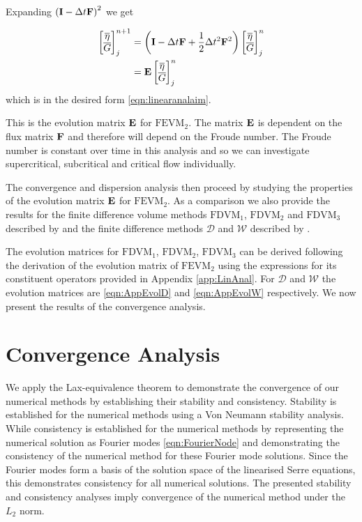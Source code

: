 Expanding $\left(\mathbf{I} - \Delta t\mathbf{F} \right)^2$ we get

\begin{align}
\begin{bmatrix}
\overline{\eta} \\ \overline{G}
\end{bmatrix}^{n+1}_j &= \left(\mathbf{I}  -\Delta t\mathbf{F} + \frac{1}{2}\Delta t^2\mathbf{F}^2 \right) \begin{bmatrix}
\overline{\eta} \\ \overline{G}
\end{bmatrix}^{n}_j \nonumber\\ &=  \mathbf{E}\begin{bmatrix}
\overline{\eta} \\ \overline{G}
\end{bmatrix}^{n}_j
\label{eqn:evolutionmatrix}
\end{align}
which is in the desired form \eqref{eqn:linearanalaim}.

This is the evolution matrix $\mathbf{E}$ for $\text{FEVM}_2$. The matrix $\mathbf{E}$ is dependent on the flux matrix $\mathbf{F}$ and therefore will depend on the Froude number. The Froude number is constant over time in this analysis and so we can investigate supercritical, subcritical and critical flow individually.

The convergence and dispersion analysis then proceed by studying the properties of the evolution matrix $\mathbf{E}$ for $\text{FEVM}_2$. As a comparison we also provide the results for the finite difference volume methods $\text{FDVM}_1$, $\text{FDVM}_2$ and $\text{FDVM}_3$ described by \citet{Zoppou-etal-2017} and the finite difference methods $\mathcal{D}$ and $\mathcal{W}$ described by \citet{Pitt-2018-61}.

The evolution matrices for $\text{FDVM}_1$, $\text{FDVM}_2$, $\text{FDVM}_3$ can be derived following the derivation of the evolution matrix of $\text{FEVM}_2$ using the expressions for its constituent operators provided in Appendix \ref{app:LinAnal}. For $\mathcal{D}$ and $\mathcal{W}$ the evolution matrices are \eqref{eqn:AppEvolD} and \eqref{eqn:AppEvolW} respectively. We now present the results of the convergence analysis.

\section{Convergence Analysis}
We apply the Lax-equivalence theorem to demonstrate the convergence of our numerical methods by establishing their stability and consistency. Stability is established for the numerical methods using a Von Neumann stability analysis. While consistency is established for the numerical methods by representing the numerical solution as Fourier modes \eqref{eqn:FourierNode} and demonstrating the consistency of the numerical method for these Fourier mode solutions. Since the Fourier modes form a basis of the solution space of the linearised Serre equations, this demonstrates consistency for all numerical solutions. The presented stability and consistency analyses imply convergence of the numerical method under the $L_2$ norm. 

